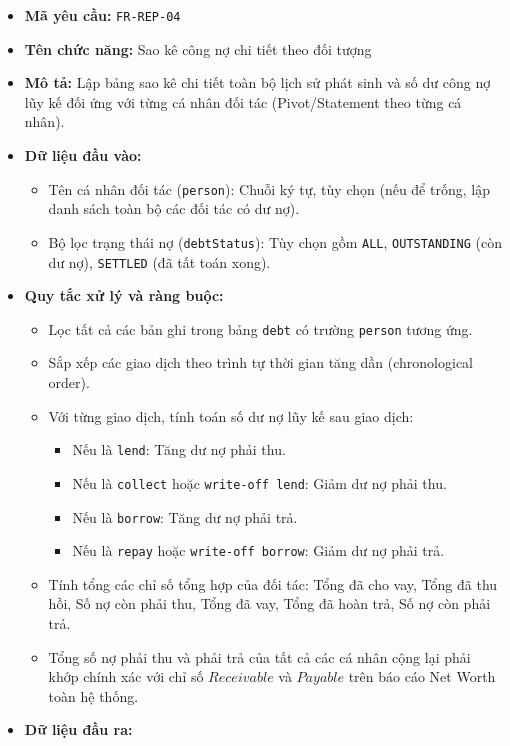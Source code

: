 \documentclass[11pt,a4paper]{article}
\providecommand{\tightlist}{
  \setlength{\itemsep}{0pt}\setlength{\parskip}{0pt}}
\begin{document}
\begin{itemize}
\tightlist
\item
  \textbf{Mã yêu cầu:} \texttt{FR-REP-04}
\item
  \textbf{Tên chức năng:} Sao kê công nợ chi tiết theo đối tượng
\item
  \textbf{Mô tả:} Lập bảng sao kê chi tiết toàn bộ lịch sử phát sinh và
  số dư công nợ lũy kế đối ứng với từng cá nhân đối tác (Pivot/Statement
  theo từng cá nhân).
\item
  \textbf{Dữ liệu đầu vào:}

  \begin{itemize}
  \tightlist
  \item
    Tên cá nhân đối tác (\texttt{person}): Chuỗi ký tự, tùy chọn (nếu để
    trống, lập danh sách toàn bộ các đối tác có dư nợ).
  \item
    Bộ lọc trạng thái nợ (\texttt{debtStatus}): Tùy chọn gồm
    \texttt{ALL}, \texttt{OUTSTANDING} (còn dư nợ), \texttt{SETTLED} (đã
    tất toán xong).
  \end{itemize}
\item
  \textbf{Quy tắc xử lý và ràng buộc:}

  \begin{itemize}
  \tightlist
  \item
    Lọc tất cả các bản ghi trong bảng \texttt{debt} có trường
    \texttt{person} tương ứng.
  \item
    Sắp xếp các giao dịch theo trình tự thời gian tăng dần
    (chronological order).
  \item
    Với từng giao dịch, tính toán số dư nợ lũy kế sau giao dịch:

    \begin{itemize}
    \tightlist
    \item
      Nếu là \texttt{lend}: Tăng dư nợ phải thu.
    \item
      Nếu là \texttt{collect} hoặc \texttt{write-off\ lend}: Giảm dư nợ
      phải thu.
    \item
      Nếu là \texttt{borrow}: Tăng dư nợ phải trả.
    \item
      Nếu là \texttt{repay} hoặc \texttt{write-off\ borrow}: Giảm dư nợ
      phải trả.
    \end{itemize}
  \item
    Tính tổng các chỉ số tổng hợp của đối tác: Tổng đã cho vay, Tổng đã
    thu hồi, Số nợ còn phải thu, Tổng đã vay, Tổng đã hoàn trả, Số nợ
    còn phải trả.
  \item
    Tổng số nợ phải thu và phải trả của tất cả các cá nhân cộng lại phải
    khớp chính xác với chỉ số \(Receivable\) và \(Payable\) trên báo cáo
    Net Worth toàn hệ thống.
  \end{itemize}
\item
  \textbf{Dữ liệu đầu ra:}


\end{itemize}
\end{document}
